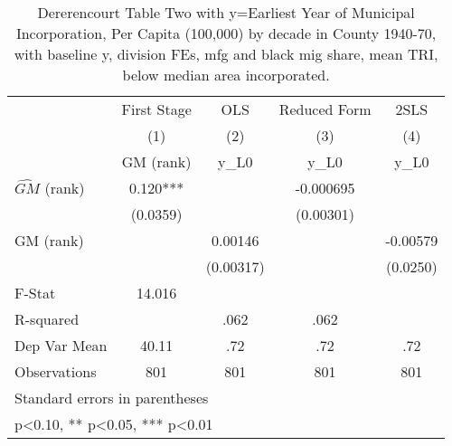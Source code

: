 \begin{table}[htbp]\centering
\def\sym#1{\ifmmode^{#1}\else\(^{#1}\)\fi}
\caption{Dererencourt Table Two with y=Earliest Year of Municipal Incorporation, Per Capita (100,000) by decade in County 1940-70, with baseline y, division FEs, mfg and black mig share, mean TRI, below median area incorporated.}
\begin{tabular}{l*{4}{c}}
\toprule
                    & First Stage   &         OLS   &Reduced Form   &        2SLS   \\
                    &\multicolumn{1}{c}{(1)}&\multicolumn{1}{c}{(2)}&\multicolumn{1}{c}{(3)}&\multicolumn{1}{c}{(4)}\\
                    &\multicolumn{1}{c}{GM  (rank)}&\multicolumn{1}{c}{y\_L0}&\multicolumn{1}{c}{y\_L0}&\multicolumn{1}{c}{y\_L0}\\
\midrule
$\hat{GM}$ (rank)   &       0.120***&               &   -0.000695   &               \\
                    &    (0.0359)   &               &   (0.00301)   &               \\
\addlinespace
GM  (rank)          &               &     0.00146   &               &    -0.00579   \\
                    &               &   (0.00317)   &               &    (0.0250)   \\
\midrule
F-Stat              &      14.016   &               &               &               \\
R-squared           &               &        .062   &        .062   &               \\
Dep Var Mean        &       40.11   &         .72   &         .72   &         .72   \\
Observations        &         801   &         801   &         801   &         801   \\
\bottomrule
\multicolumn{5}{l}{\footnotesize Standard errors in parentheses}\\
\multicolumn{5}{l}{\footnotesize * p<0.10, ** p<0.05, *** p<0.01}\\
\end{tabular}
\end{table}
